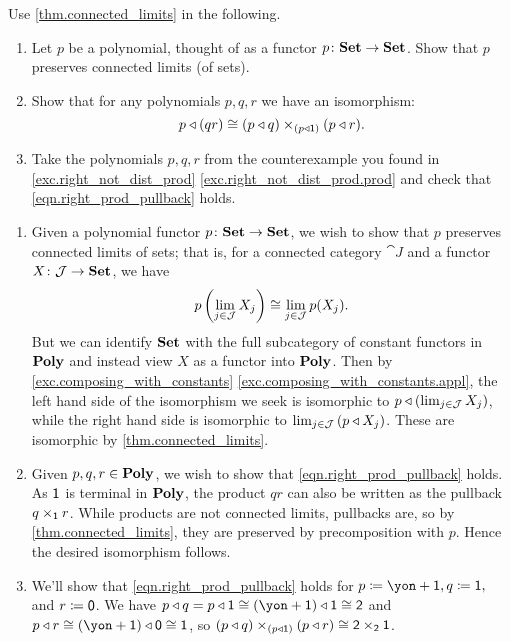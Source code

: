 \documentclass[Book-Poly]{subfiles}
\begin{document}
\begin{exercise}\label{ex.connected_limits_and_tri}
Use \cref{thm.connected_limits} in the following.
\begin{enumerate}
	\item Let $p$ be a polynomial, thought of as a functor $p\colon\mathbf{Set}\to\mathbf{Set}$. Show that $p$ preserves connected limits (of sets).
	\item Show that for any polynomials $p,q,r$ we have an isomorphism:
	\begin{equation} \label{eqn.right_prod_pullback}
	p\mathbin{\triangleleft}(qr)\cong (p\mathbin{\triangleleft} q)\times_{(p\mathbin{\triangleleft}\textsf{1})}(p\mathbin{\triangleleft} r).
	\end{equation}
	\item Take the polynomials $p,q,r$ from the counterexample you found in \cref{exc.right_not_dist_prod} \cref{exc.right_not_dist_prod.prod} and check that \eqref{eqn.right_prod_pullback} holds.
\qedhere
\end{enumerate}
\begin{solution}
\begin{enumerate}
    \item Given a polynomial functor $p \colon \mathbf{Set} \to \mathbf{Set}$, we wish to show that $p$ preserves connected limits of sets; that is, for a connected category $\cat{J}$ and a functor $X \colon \mathcal{J} \to \mathbf{Set}$, we have
    \[
        p\left(\lim_{j \in \mathcal{J}} X_j\right) \cong \lim_{j \in \mathcal{J}} p(X_j).
    \]
    But we can identify $\mathbf{Set}$ with the full subcategory of constant functors in $\mathbf{Poly}$ and instead view $X$ as a functor into $\mathbf{Poly}$.
    Then by \cref{exc.composing_with_constants} \cref{exc.composing_with_constants.appl}, the left hand side of the isomorphism we seek is isomorphic to $p\mathbin{\triangleleft}\left(\lim_{j \in \mathcal{J}} X_j\right)$, while the right hand side is isomorphic to $\lim_{j \in \mathcal{J}} \left(p \mathbin{\triangleleft} X_j\right)$.
    These are isomorphic by \cref{thm.connected_limits}.
    \item Given $p,q,r \in \mathbf{Poly}$, we wish to show that \eqref{eqn.right_prod_pullback} holds.
    As $\textsf{1}$ is terminal in $\mathbf{Poly}$, the product $qr$ can also be written as the pullback $q \times_{\textsf{1}} r$.
    While products are not connected limits, pullbacks are, so by \cref{thm.connected_limits}, they are preserved by precomposition with $p$.
    Hence the desired isomorphism follows.
    \item We'll show that \eqref{eqn.right_prod_pullback} holds for $p\coloneqq\yon+\1, q\coloneqq\1,$ and $r\coloneqq\textsf{0}$.
    We have $p\tri q = p\tri\1 \iso (\yon+\1)\tri\1 \iso \2$ and $p\tri r \iso (\yon+\1)\tri\0 \iso \1$, so $(p\mathbin{\triangleleft} q)\times_{(p\mathbin{\triangleleft}\textsf{1})}(p\mathbin{\triangleleft} r) \cong \textsf{2} \times_{\textsf{2}} \textsf{1}$.

\end{enumerate}
\end{solution}
\end{exercise}
\end{document}
